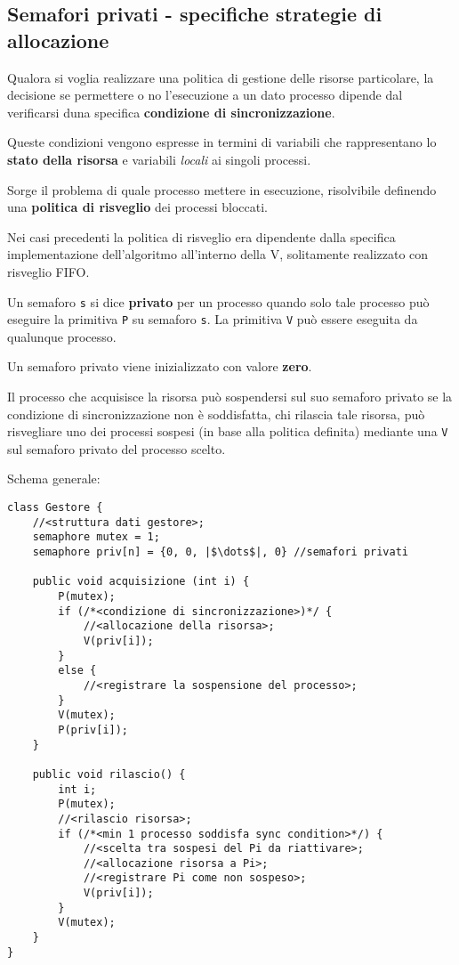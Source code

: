 \subsection{Semafori privati - specifiche strategie di allocazione}
Qualora si voglia realizzare una politica di gestione delle risorse particolare, la decisione se permettere o no l'esecuzione a un dato processo dipende dal verificarsi duna specifica \textbf{condizione di sincronizzazione}.

Queste condizioni vengono espresse in termini di variabili che rappresentano lo \textbf{stato della risorsa} e variabili \textit{locali} ai singoli processi.

Sorge il problema di quale processo mettere in esecuzione, risolvibile definendo una \textbf{politica di risveglio} dei processi bloccati.

Nei casi precedenti la politica di risveglio era dipendente dalla specifica implementazione dell'algoritmo all'interno della V, solitamente realizzato con risveglio FIFO.

\begin{mdframed}[topline=false,bottomline=false,rightline=false]
    Un semaforo \texttt{s} si dice \textbf{privato} per un processo quando solo tale processo può eseguire la primitiva \texttt{P} su semaforo \texttt{s}. La primitiva \texttt{V} può essere eseguita da qualunque processo.
\end{mdframed}

Un semaforo privato viene inizializzato con valore \textbf{zero}.

Il processo che acquisisce la risorsa può sospendersi sul suo semaforo privato se la condizione di sincronizzazione non è soddisfatta, chi rilascia tale risorsa, può risvegliare uno dei processi sospesi (in base alla politica definita) mediante una \texttt{V} sul semaforo privato del processo scelto.

Schema generale:

\begin{verbatim}
class Gestore {
    //<struttura dati gestore>;
    semaphore mutex = 1;
    semaphore priv[n] = {0, 0, |$\dots$|, 0} //semafori privati

    public void acquisizione (int i) {
        P(mutex);
        if (/*<condizione di sincronizzazione>)*/ {
            //<allocazione della risorsa>;
            V(priv[i]);
        }
        else {
            //<registrare la sospensione del processo>;
        }
        V(mutex);
        P(priv[i]);
    }

    public void rilascio() {
        int i;
        P(mutex);
        //<rilascio risorsa>;
        if (/*<min 1 processo soddisfa sync condition>*/) {
            //<scelta tra sospesi del Pi da riattivare>;
            //<allocazione risorsa a Pi>;
            //<registrare Pi come non sospeso>;
            V(priv[i]);
        }
        V(mutex);
    }
}
\end{verbatim}

